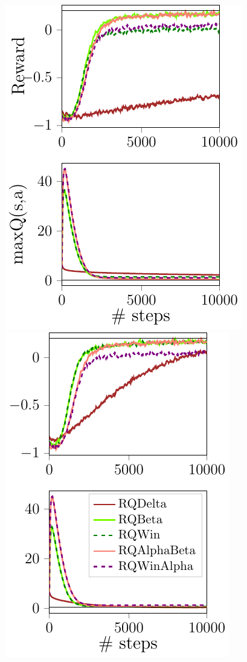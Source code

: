 \documentclass[portrait,a0paper,fontscale=0.312]{baposter}
\begin{document}
\begin{poster}
{\begin{minipage}{0.5\textwidth}
\end{minipage}%
%
\hfill
%
\begin{minipage}{0.5\textwidth}
\includegraphics[scale=0.55]{./imgs/gridHasselt/QDecs1.pdf}
\includegraphics[scale=0.55]{./imgs/gridHasselt/QDecs08.pdf}
\end{minipage}

}
\end{poster}
\end{document}
